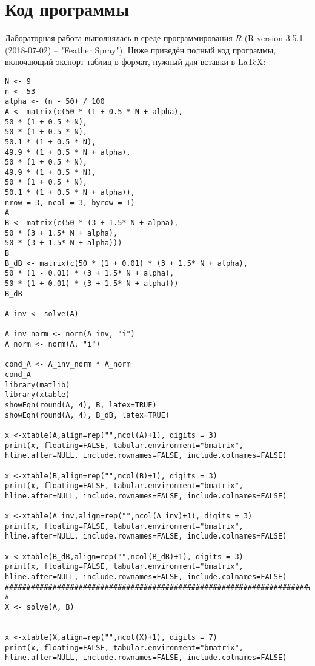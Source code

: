 \documentclass[14pt,a4paper]{scrartcl}
\begin{document}
\section*{Код программы}
Лабораторная работа выполнялась в среде программирования $R$ (R version 3.5.1 (2018-07-02) -- "Feather Spray"). Ниже приведён полный код программы, включающий экспорт таблиц в формат, нужный для вставки в \LaTeX:

\begin{lstlisting}
N <- 9
n <- 53
alpha <- (n - 50) / 100
A <- matrix(c(50 * (1 + 0.5 * N + alpha),
50 * (1 + 0.5 * N),
50 * (1 + 0.5 * N),
50.1 * (1 + 0.5 * N),
49.9 * (1 + 0.5 * N + alpha),
50 * (1 + 0.5 * N),
49.9 * (1 + 0.5 * N),
50 * (1 + 0.5 * N),
50.1 * (1 + 0.5 * N + alpha)),
nrow = 3, ncol = 3, byrow = T)
A
B <- matrix(c(50 * (3 + 1.5* N + alpha),
50 * (3 + 1.5* N + alpha),
50 * (3 + 1.5* N + alpha)))
B
B_dB <- matrix(c(50 * (1 + 0.01) * (3 + 1.5* N + alpha),
50 * (1 - 0.01) * (3 + 1.5* N + alpha),
50 * (1 + 0.01) * (3 + 1.5* N + alpha)))
B_dB

A_inv <- solve(A)

A_inv_norm <- norm(A_inv, "i")
A_norm <- norm(A, "i")

cond_A <- A_inv_norm * A_norm
cond_A
library(matlib)
library(xtable)
showEqn(round(A, 4), B, latex=TRUE)
showEqn(round(A, 4), B_dB, latex=TRUE)

x <-xtable(A,align=rep("",ncol(A)+1), digits = 3)
print(x, floating=FALSE, tabular.environment="bmatrix", 
hline.after=NULL, include.rownames=FALSE, include.colnames=FALSE)

x <-xtable(B,align=rep("",ncol(B)+1), digits = 3)
print(x, floating=FALSE, tabular.environment="bmatrix", 
hline.after=NULL, include.rownames=FALSE, include.colnames=FALSE)

x <-xtable(A_inv,align=rep("",ncol(A_inv)+1), digits = 3)
print(x, floating=FALSE, tabular.environment="bmatrix", 
hline.after=NULL, include.rownames=FALSE, include.colnames=FALSE)

x <-xtable(B_dB,align=rep("",ncol(B_dB)+1), digits = 3)
print(x, floating=FALSE, tabular.environment="bmatrix", 
hline.after=NULL, include.rownames=FALSE, include.colnames=FALSE)
###################################################################################
#
X <- solve(A, B)


x <-xtable(X,align=rep("",ncol(X)+1), digits = 7)
print(x, floating=FALSE, tabular.environment="bmatrix", 
hline.after=NULL, include.rownames=FALSE, include.colnames=FALSE)


\end{lstlisting}
\end{document}
